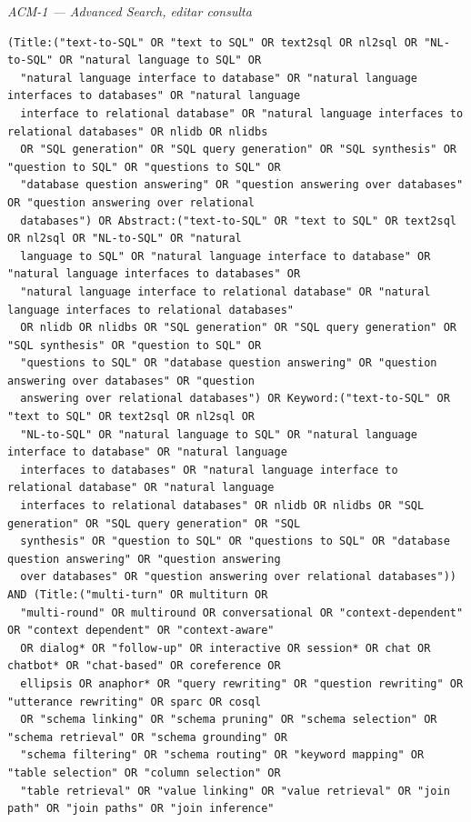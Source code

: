 \par\medskip\noindent\textit{ACM-1 — Advanced Search, editar consulta}\par\nopagebreak
\begin{lstlisting}
(Title:("text-to-SQL" OR "text to SQL" OR text2sql OR nl2sql OR "NL-to-SQL" OR "natural language to SQL" OR
  "natural language interface to database" OR "natural language interfaces to databases" OR "natural language
  interface to relational database" OR "natural language interfaces to relational databases" OR nlidb OR nlidbs
  OR "SQL generation" OR "SQL query generation" OR "SQL synthesis" OR "question to SQL" OR "questions to SQL" OR
  "database question answering" OR "question answering over databases" OR "question answering over relational
  databases") OR Abstract:("text-to-SQL" OR "text to SQL" OR text2sql OR nl2sql OR "NL-to-SQL" OR "natural
  language to SQL" OR "natural language interface to database" OR "natural language interfaces to databases" OR
  "natural language interface to relational database" OR "natural language interfaces to relational databases"
  OR nlidb OR nlidbs OR "SQL generation" OR "SQL query generation" OR "SQL synthesis" OR "question to SQL" OR
  "questions to SQL" OR "database question answering" OR "question answering over databases" OR "question
  answering over relational databases") OR Keyword:("text-to-SQL" OR "text to SQL" OR text2sql OR nl2sql OR
  "NL-to-SQL" OR "natural language to SQL" OR "natural language interface to database" OR "natural language
  interfaces to databases" OR "natural language interface to relational database" OR "natural language
  interfaces to relational databases" OR nlidb OR nlidbs OR "SQL generation" OR "SQL query generation" OR "SQL
  synthesis" OR "question to SQL" OR "questions to SQL" OR "database question answering" OR "question answering
  over databases" OR "question answering over relational databases")) AND (Title:("multi-turn" OR multiturn OR
  "multi-round" OR multiround OR conversational OR "context-dependent" OR "context dependent" OR "context-aware"
  OR dialog* OR "follow-up" OR interactive OR session* OR chat OR chatbot* OR "chat-based" OR coreference OR
  ellipsis OR anaphor* OR "query rewriting" OR "question rewriting" OR "utterance rewriting" OR sparc OR cosql
  OR "schema linking" OR "schema pruning" OR "schema selection" OR "schema retrieval" OR "schema grounding" OR
  "schema filtering" OR "schema routing" OR "keyword mapping" OR "table selection" OR "column selection" OR
  "table retrieval" OR "value linking" OR "value retrieval" OR "join path" OR "join paths" OR "join inference"

\end{lstlisting}

